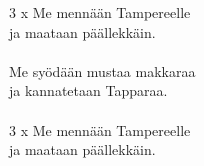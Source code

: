 
            3 x Me mennään Tampereelle \\
            ja maataan päällekkäin. \\
\hspace{10mm} \\
            Me syödään mustaa makkaraa \\
            ja kannatetaan Tapparaa. \\
\hspace{10mm} \\
            3 x Me mennään Tampereelle \\
            ja maataan päällekkäin. \\
